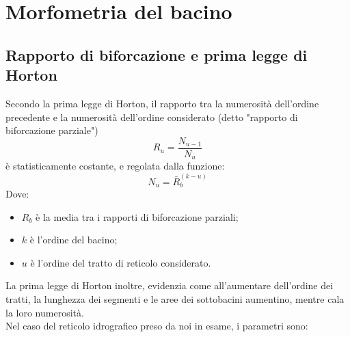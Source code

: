 \section{Morfometria del bacino}
\subsection{Rapporto di biforcazione e prima legge di Horton}
Secondo la prima legge di Horton, il rapporto tra la numerosità dell'ordine precedente e la numerosità dell'ordine considerato (detto "rapporto di biforcazione parziale")
\begin{equation}
    R_u = \frac{N_{u-1}}{N_u}
\end{equation}
è statisticamente costante, e regolata dalla funzione:
\begin{equation}
    N_u= \bar{R}_b ^{(k-u)}
\end{equation}
Dove: 
\begin{itemize}
    \item $R_b$ è la media tra i rapporti di biforcazione parziali;
    \item $k$ è l'ordine del bacino;
    \item $u$ è l'ordine del tratto di reticolo considerato.
\end{itemize}
La prima legge di Horton inoltre, evidenzia come all'aumentare dell'ordine dei tratti, la lunghezza dei segmenti e le aree dei sottobacini aumentino, mentre cala la loro numerosità.\\
Nel caso del reticolo idrografico preso da noi in esame, i parametri sono: 

